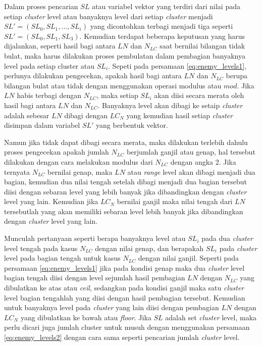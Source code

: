 Dalam proses pencarian $SL$ atau variabel vektor yang terdiri dari nilai pada setiap \textit{cluster} level atau banyaknya level dari setiap \textit{cluster} menjadi $SL' = \left (SL_{0}, SL_{1},... , SL_{i} \right)$ yang dicontohkan terbagi menjadi tiga seperti $SL' = \left (SL_{0}, SL_{1}, SL_{3} \right )$. Kemudian terdapat beberapa keputusan yang harus dijalankan, seperti hasil bagi antara $LN$ dan $N_{LC}$ saat bernilai bilangan tidak bulat, maka harus dilakukan proses pembulatan dalam pembagian banyaknya level pada setiap cluster atau $SL_{i}$. Sepeti pada persamaan \ref{eq:enemy_levels1}, perlunya dilakukan pengecekan, apakah hasil bagi antara $LN$ dan $N_{LC}$ berupa bilangan bulat atau tidak dengan menggunakan operasi modulus atau $mod$. Jika $LN$ habis terbagi dengan $N_{LC}$, maka setiap $SL_{i}$ akan diisi secara merata oleh hasil bagi antara $LN$ dan $N_{LC}$. Banyaknya level akan dibagi ke setaip \textit{cluster} adalah sebesar $LN$ dibagi dengan $LC_{N}$ yang kemudian hasil setiap \textit{cluster} disimpan dalam variabel $SL'$ yang berbentuk vektor.
\vspace{1ex}

Namun jika tidak dapat dibagi secara merata, maka dilakukan terlebih dahulu proses pengecekan apakah jumlah $N_{LC}$ berjumlah ganjil atau genap, hal tersebut dilakukan dengan cara melakukan modulus dari $N_{LC}$ dengan angka 2. Jika ternyata $N_{LC}$ bernilai genap, maka $LN$ atau \textit{range} level akan dibagi menjadi dua bagian, kemudian dua nilai tengah setelah dibagi menjadi dua bagian tersebut diisi dengan sebaran level yang lebih banyak jika dibandingkan dengan \textit{cluster} level yang lain. Kemudian jika $LC_{N}$ bernilai ganjil maka nilai tengah dari $LN$ tersebutlah yang akan memiliki sebaran level lebih banyak jika dibandingkan dengan \textit{cluster} level yang lain.
\vspace{1ex}

Munculah pertanyaan seperti berapa banyaknya level atau $SL_{i}$ pada dua \textit{cluster} level tengah pada kasus $N_{LC}$ dengan nilai genap, dan berapakah $SL_{i}$ pada \textit{cluster} level pada bagian tengah untuk kasus $N_{LC}$ dengan nilai ganjil. Seperti pada persamaan \ref{eq:enemy_levels1} jika pada kondisi genap maka dua \textit{cluster} level bagian tengah diisi dengan level sejumlah hasil pembagian $LN$ dengan $N_{LC}$ yang dibulatkan ke atas atau \textit{ceil}, sedangkan pada kondisi ganjil maka satu \textit{cluster} level bagian tengahlah yang diisi dengan hasil pembagian tersebut. Kemudian untuk banyaknya level pada \textit{cluster} yang lain diisi dengan pembagian $LN$ dengan $LC_{N}$ yang dibulatkan ke bawah atau \textit{floor}. Jika $SL$ adalah set \textit{cluster} level, maka perlu dicari juga jumlah cluster untuk musuh dengan menggunakan persamaan \ref{eq:enemy_levels2} dengan cara sama seperti pencarian jumlah \textit{cluster} level. 
\vspace{1ex}

